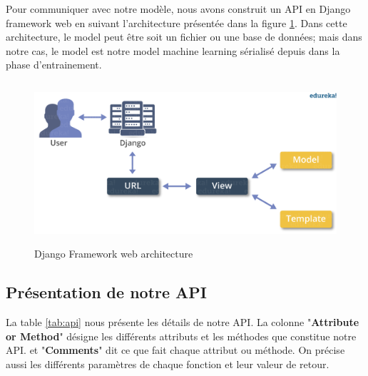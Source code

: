 \documentclass[12pt, french]{report}
\begin{document}
Pour communiquer avec notre modèle, nous avons construit un API en Django framework web en suivant l'architecture présentée dans la figure \ref{django}. Dans cette architecture, le model peut être soit un fichier ou une base de données; mais dans notre cas, le model est notre model machine learning sérialisé depuis dans la phase d'entrainement. 
\begin{figure}[h]
	\includegraphics[width=15cm, height=6cm ]{images/ArchitectureDjango.png}
	\caption{Django Framework web architecture }
	\label{django}
\end{figure} 

\subsection{Présentation de notre API}

La table \ref{tab:api} nous présente les détails de notre API. La colonne "\textbf{Attribute or Method}" désigne les différents attributs et les méthodes que constitue notre API. et "\textbf{Comments}" dit ce que fait chaque attribut ou méthode. On précise aussi les différents paramètres de chaque fonction et leur valeur de retour. 
\end{document}
